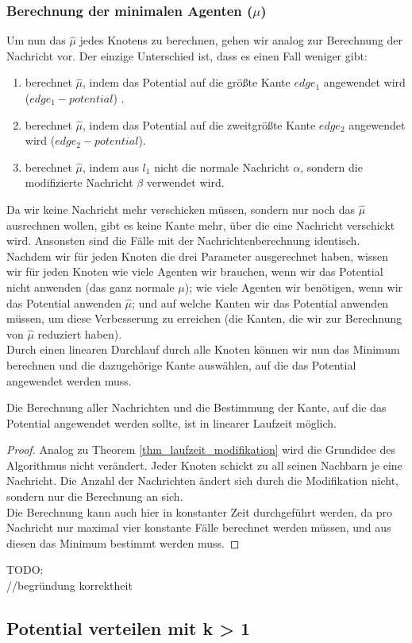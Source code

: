 	
	\subsubsection{Berechnung der minimalen Agenten ($\mu$)}
	
	Um nun das $\hat{\mu}$ jedes Knotens zu berechnen, gehen wir analog zur Berechnung der Nachricht vor. Der einzige Unterschied ist, dass es einen Fall weniger gibt: 
	\begin{enumerate}
		\item berechnet $\hat{\mu}$, indem das Potential auf die größte Kante $edge_{1}$ angewendet wird ($edge_{1} - potential$) .
		\item berechnet $\hat{\mu}$, indem das Potential auf die zweitgrößte Kante $edge_{2}$ angewendet wird ($edge_{2} - potential$).
		\item berechnet $\hat{\mu}$, indem aus $l_{1}$ nicht die normale Nachricht $\alpha$, sondern die modifizierte Nachricht $\beta$ verwendet wird.
	\end{enumerate}
	Da wir keine Nachricht mehr verschicken müssen, sondern nur noch das $\hat{\mu}$ ausrechnen wollen, gibt es keine Kante mehr, über die eine Nachricht verschickt wird. Ansonsten sind die Fälle mit der Nachrichtenberechnung identisch.\\
	Nachdem wir für jeden Knoten die drei Parameter ausgerechnet haben, wissen wir für jeden Knoten wie viele Agenten wir brauchen, wenn wir das Potential nicht anwenden (das ganz normale $\mu$); wie viele Agenten wir benötigen, wenn wir das Potential anwenden $\hat{\mu}$; und auf welche Kanten wir das Potential anwenden müssen, um diese Verbesserung zu erreichen (die Kanten, die wir zur Berechnung von $\hat{\mu}$ reduziert haben).\\
	Durch einen linearen Durchlauf durch alle Knoten können wir nun das Minimum berechnen und die dazugehörige Kante auswählen, auf die das Potential angewendet werden muss.
	\begin{theorem}
		Die Berechnung aller Nachrichten und die Bestimmung der Kante, auf die das Potential angewendet werden sollte, ist in linearer Laufzeit möglich.
	\end{theorem}
	\begin{proof}
		Analog zu Theorem \ref{thm_laufzeit_modifikation} wird die Grundidee des Algorithmus nicht verändert. Jeder Knoten schickt zu all seinen Nachbarn je eine Nachricht. Die Anzahl der Nachrichten ändert sich durch die Modifikation nicht, sondern nur die Berechnung an sich.\\Die Berechnung kann auch hier in konstanter Zeit durchgeführt werden, da pro Nachricht nur maximal vier konstante Fälle berechnet werden müssen, und aus diesen das Minimum bestimmt werden muss.
	\end{proof}
	TODO:\\
	//begründung korrektheit

\subsection{Potential verteilen mit k > 1}